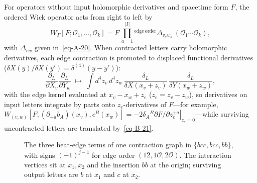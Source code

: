 \documentclass[11pt]{article}
\newcommand{\bbtri}[4]{\begin{scope}[xshift=#1]
  \coordinate (a) at (-1.0,1.5); \coordinate (b) at (1.0,1.5); \coordinate (o) at (0,0);
  \draw[#2] (a)--(b); \draw[#3] (a)--(o); \draw[#4] (b)--(o);
  \draw[hfout] (a)--++(-.42,.6); \draw[hfout] (b)--++(.42,.6);
  \node[hfv] at (a) {}; \node[hfv] at (b) {}; \node[hfo] at (o) {};
  \node[font=\scriptsize,teal!45!black] at (-1.55,2.33) {$b$}; \node[font=\scriptsize,teal!45!black] at (1.55,2.33) {$c$};
  \node[font=\scriptsize,anchor=east] at (-1.1,1.4) {$x_1$}; \node[font=\scriptsize,anchor=west] at (1.1,1.4) {$x_2$};
  \node[font=\scriptsize] at (0,-.38) {$bb\,(0)$};
  \node[font=\tiny,black!60] at (-.62,1.68) {$c$}; \node[font=\tiny,black!60] at (.62,1.68) {$b$};
  \node[font=\tiny,black!60] at (-1.0,1.05) {$c$}; \node[font=\tiny,black!60] at (-.42,.2) {$b$};
  \node[font=\tiny,black!60] at (1.0,1.05) {$c$}; \node[font=\tiny,black!60] at (.42,.2) {$b$};
  \end{scope}}
\numberwithin{equation}{section}
\numberwithin{figure}{section}
\numberwithin{table}{section}
\begin{document}
For operators without input holomorphic derivatives and spacetime form $F$, the ordered Wick operator acts from right to left by
\begin{equation}\label{eq-W-fibre-explicit}
W_\Gamma[F;\mathcal O_1,\ldots,\mathcal O_k]
=F\,\prod_{a=1}^{|I|}\!{}^{\mathrm{edge\ order}}
\Delta_{v_aw_a}\,
(\mathcal O_1\cdots\mathcal O_k),
\end{equation}
with $\Delta_{vw}$ given in~\eqref{eq-A-20}. When contracted letters carry holomorphic derivatives, each edge contraction is promoted to displaced functional derivatives ($\delta X(y)/\delta X(y')=\delta^{(4)}(y-y')$):
\begin{equation}\label{eq-W-jet-edge}
\frac{\partial_L}{\partial X_v}\frac{\partial_L}{\partial Y_w}
\;\longmapsto\;
\int d^4z_v\,d^4z_w\,
\frac{\delta_L}{\delta X(x_v+z_v)}\,
\frac{\delta_L}{\delta Y(x_w+z_w)},
\end{equation}
with the edge kernel evaluated at $x_v-x_w+z_e$ ($z_e=z_v-z_w$), so derivatives on input letters integrate by parts onto $z_e$-derivatives of $F$---for example, $W_{(v,w)}[F;(\partial_{+\dot a}b_A)(x_v),c^B(x_w)]=-2\delta_A{}^B\left.\partial F/\partial z_e^{+\dot a}\right|_{z_e=0}$---while surviving uncontracted letters are translated by~\eqref{eq-B-21}.

\begin{figure}[H]
\centering
{}
\caption{The three heat-edge terms of one contraction graph in $\{bcc,bcc,bb\}$, with signs $(-1)^{j-1}$ for edge order $(12,1\mathcal O,2\mathcal O)$. The interaction vertices sit at $x_1,x_2$ and the insertion $bb$ at the origin; surviving output letters are $b$ at $x_1$ and $c$ at $x_2$.}
\label{b-00153}
\end{figure}
\end{document}
